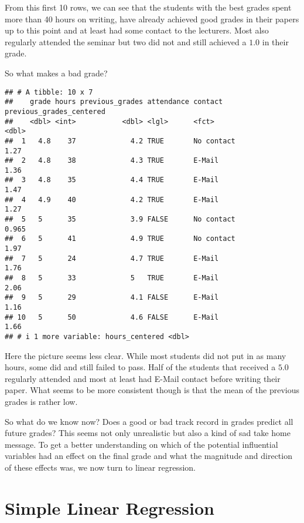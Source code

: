 \documentclass[
]{book}
\begin{document}
From this first 10 rows, we can see that the students with the best grades spent
more than 40 hours on writing, have already achieved good grades in their papers
up to this point and at least had some contact to the lecturers. Most also
regularly attended the seminar but two did not and still achieved a \(1.0\) in
their grade.

So what makes a bad grade?

\begin{verbatim}
## # A tibble: 10 x 7
##    grade hours previous_grades attendance contact    previous_grades_centered
##    <dbl> <int>           <dbl> <lgl>      <fct>                         <dbl>
##  1   4.8    37             4.2 TRUE       No contact                    1.27 
##  2   4.8    38             4.3 TRUE       E-Mail                        1.36 
##  3   4.8    35             4.4 TRUE       E-Mail                        1.47 
##  4   4.9    40             4.2 TRUE       E-Mail                        1.27 
##  5   5      35             3.9 FALSE      No contact                    0.965
##  6   5      41             4.9 TRUE       No contact                    1.97 
##  7   5      24             4.7 TRUE       E-Mail                        1.76 
##  8   5      33             5   TRUE       E-Mail                        2.06 
##  9   5      29             4.1 FALSE      E-Mail                        1.16 
## 10   5      50             4.6 FALSE      E-Mail                        1.66 
## # i 1 more variable: hours_centered <dbl>
\end{verbatim}

Here the picture seems less clear. While most students did not put in as many
hours, some did and still failed to pass. Half of the students that received a
\(5.0\) regularly attended and most at least had E-Mail contact before writing
their paper. What seems to be more consistent though is that the mean of the
previous grades is rather low.

So what do we know now? Does a good or bad track record in grades predict all
future grades? This seems not only unrealistic but also a kind of sad take home
message. To get a better understanding on which of the potential influential
variables had an effect on the final grade and what the magnitude and direction
of these effects was, we now turn to linear regression.

\hypertarget{simple-linear-regression}{%
\section{Simple Linear Regression}\label{simple-linear-regression}}
\end{document}
